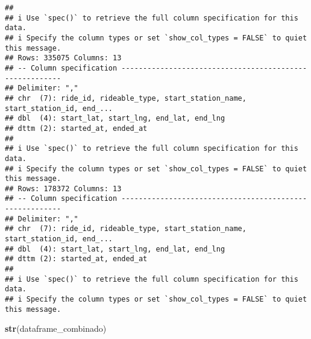 \documentclass[
]{article}
\newenvironment{Shaded}{\begin{snugshade}}{\end{snugshade}}
\newcommand{\FunctionTok}[1]{\textcolor[rgb]{0.13,0.29,0.53}{\textbf{#1}}}
\newcommand{\NormalTok}[1]{#1}
\begin{document}
\begin{verbatim}
## 
## i Use `spec()` to retrieve the full column specification for this data.
## i Specify the column types or set `show_col_types = FALSE` to quiet this message.
## Rows: 335075 Columns: 13
## -- Column specification --------------------------------------------------------
## Delimiter: ","
## chr  (7): ride_id, rideable_type, start_station_name, start_station_id, end_...
## dbl  (4): start_lat, start_lng, end_lat, end_lng
## dttm (2): started_at, ended_at
## 
## i Use `spec()` to retrieve the full column specification for this data.
## i Specify the column types or set `show_col_types = FALSE` to quiet this message.
## Rows: 178372 Columns: 13
## -- Column specification --------------------------------------------------------
## Delimiter: ","
## chr  (7): ride_id, rideable_type, start_station_name, start_station_id, end_...
## dbl  (4): start_lat, start_lng, end_lat, end_lng
## dttm (2): started_at, ended_at
## 
## i Use `spec()` to retrieve the full column specification for this data.
## i Specify the column types or set `show_col_types = FALSE` to quiet this message.
\end{verbatim}

\begin{Shaded}
\begin{Highlighting}[]
\FunctionTok{str}\NormalTok{(dataframe\_combinado)}
\end{Highlighting}
\end{Shaded}
\end{document}
